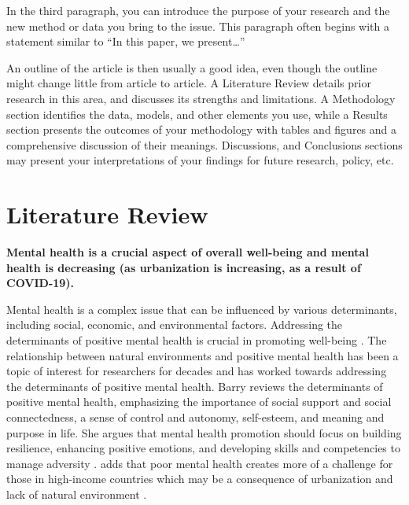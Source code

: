 \documentclass[
  letterpaper,
  authoryear]{elsarticle}
\begin{document}
In the third paragraph, you can introduce the purpose of your research
and the new method or data you bring to the issue. This paragraph often
begins with a statement similar to ``In this paper, we present\ldots{}''

An outline of the article is then usually a good idea, even though the
outline might change little from article to article. A Literature Review
details prior research in this area, and discusses its strengths and
limitations. A Methodology section identifies the data, models, and
other elements you use, while a Results section presents the outcomes of
your methodology with tables and figures and a comprehensive discussion
of their meanings. Discussions, and Conclusions sections may present
your interpretations of your findings for future research, policy, etc.


\hypertarget{literature-review}{%
\section{Literature Review}\label{literature-review}}

\textbf{Mental health is a crucial aspect of overall well-being and
mental health is decreasing (as urbanization is increasing, as a result
of COVID-19).}

Mental health is a complex issue that can be influenced by various
determinants, including social, economic, and environmental factors.
Addressing the determinants of positive mental health is crucial in
promoting well-being \citep{barry2009} . The relationship between
natural environments and positive mental health has been a topic of
interest for researchers for decades and has worked towards addressing
the determinants of positive mental health. Barry reviews the
determinants of positive mental health, emphasizing the importance of
social support and social connectedness, a sense of control and
autonomy, self-esteem, and meaning and purpose in life. She argues that
mental health promotion should focus on building resilience, enhancing
positive emotions, and developing skills and competencies to manage
adversity \citep{barry2009} . \citet{white2021} adds that poor mental
health creates more of a challenge for those in high-income countries
which may be a consequence of urbanization and lack of natural
environment \citep{white2021}.
\end{document}
